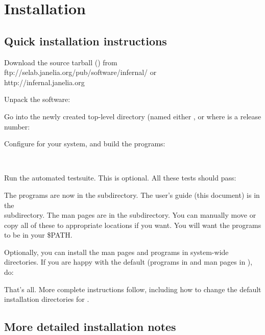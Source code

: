 \section{Installation}

\subsection{Quick installation instructions}

Download the source tarball () from 
                  {ftp://selab.janelia.org/pub/software/infernal/}
or \\
                  {http://infernal.janelia.org}

Unpack the software:


Go into the newly created top-level directory (named either
, or  where  is a release
number:


Configure for your system, and build the programs:

\\

Run the automated testsuite. This is optional. All these tests should
pass:


The programs are now in the  subdirectory. The user's guide
(this document) is in the \\ 
subdirectory. The man pages are in the 
subdirectory. You can manually move or copy all of these to
appropriate locations if you want. You will want the programs to be in
your \$PATH. 

Optionally, you can install the man pages and programs in system-wide
directories. If you are happy with the default (programs in
 and man pages in ),
do:


That's all.  More complete instructions follow, including how to
change the default installation directories for .

\subsection{More detailed installation notes}

